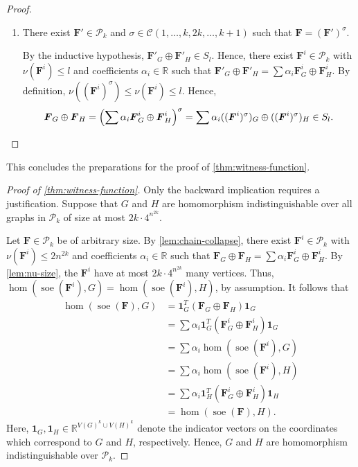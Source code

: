 \documentclass[11pt,a4paper]{article}
\theoremstyle{plain}
\theoremstyle{remark}
\theoremstyle{definition}
\DeclareMathOperator{\soe}{soe}
\newcommand{\cyclicpermutations}{\mathscr{C}(1,\dots, k, 2k, \dots, k+1)}
\begin{document}
\begin{proof}
\begin{enumerate}
		\item There exist $\boldsymbol{F}' \in \mathcal{P}_k$ and $\sigma \in \cyclicpermutations$ such that $\boldsymbol{F} = (\boldsymbol{F}')^\sigma$.
		
		By the inductive hypothesis, $\boldsymbol{F}'_G \oplus \boldsymbol{F}'_H \in S_l$.
		Hence, there exist $\boldsymbol{F}^i \in \mathcal{P}_k$ with $\nu(\boldsymbol{F}^i) \leq l$ and coefficients $\alpha_i \in \mathbb{R}$ such that $\boldsymbol{F}'_G \oplus \boldsymbol{F}'_H  = \sum \alpha_i \boldsymbol{F}^i_G \oplus \boldsymbol{F}^i_H$.
		By definition, $\nu((\boldsymbol{F}^i)^\sigma) \leq \nu(\boldsymbol{F}^i) \leq l$.
		Hence,
		\[
		\boldsymbol{F}_G \oplus \boldsymbol{F}_H = \left( \sum \alpha_i \boldsymbol{F}^i_G \oplus \boldsymbol{F}^i_H \right)^\sigma
		= \sum \alpha_i ((\boldsymbol{F}^i)^\sigma)_G \oplus ((\boldsymbol{F}^i)^\sigma)_H
		\in S_l. \qedhere
		\] 
	\end{enumerate} 
\end{proof}

This concludes the preparations for the proof of \cref{thm:witness-function}.
\begin{proof}[Proof of \cref{thm:witness-function}]
	Only the backward implication requires a justification.
	Suppose that $G$ and $H$ are homomorphism indistinguishable over all graphs in $\mathcal{P}_k$ of size at most $2k \cdot 4^{n^{2k}}$.
	
	Let $\boldsymbol{F} \in \mathcal{P}_k$ be of arbitrary size.
	By \cref{lem:chain-collapse}, there exist $\boldsymbol{F}^i \in \mathcal{P}_k$ with $\nu(\boldsymbol{F}^i) \leq 2n^{2k}$ and coefficients $\alpha_i \in \mathbb{R}$ such that
	$\boldsymbol{F}_G \oplus \boldsymbol{F}_H = \sum \alpha_i \boldsymbol{F}^i_G \oplus \boldsymbol{F}^i_H$.
	By \cref{lem:nu-size}, the $\boldsymbol{F}^i$ have at most $2k \cdot 4^{n^{2k}}$ many vertices.
	Thus, $ \hom(\soe(\boldsymbol{F}^i), G) =  \hom(\soe(\boldsymbol{F}^i), H)$, by assumption.
	It follows that
	\begin{align*}
		\hom(\soe(\boldsymbol{F}), G)
		&= \boldsymbol{1}_G^T (\boldsymbol{F}_G \oplus \boldsymbol{F}_H) \boldsymbol{1}_G \\
		&= \sum \alpha_i \boldsymbol{1}_G^T (\boldsymbol{F}^i_G \oplus \boldsymbol{F}^i_H) \boldsymbol{1}_G \\
		&= \sum \alpha_i \hom(\soe(\boldsymbol{F}^i), G) \\
		&= \sum \alpha_i \hom(\soe(\boldsymbol{F}^i), H) \\
		&= \sum \alpha_i \boldsymbol{1}_H^T (\boldsymbol{F}^i_G \oplus \boldsymbol{F}^i_H) \boldsymbol{1}_H \\
		&= \hom(\soe(\boldsymbol{F}), H).
	\end{align*}	
	Here, $\boldsymbol{1}_G, \boldsymbol{1}_H \in \mathbb{R}^{V(G)^k \cup V(H)^k}$ denote the indicator vectors on the coordinates which correspond to $G$ and $H$, respectively.
	Hence, $G$ and $H$ are homomorphism indistinguishable over $\mathcal{P}_k$.
\end{proof}
\end{document}
